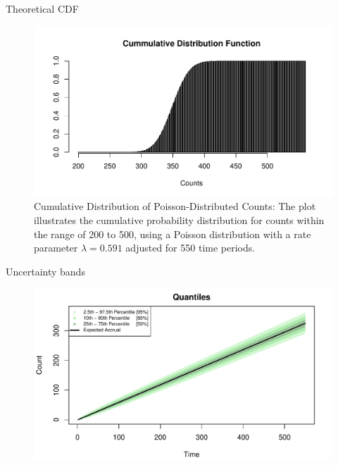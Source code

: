 \documentclass[english]{beamer}\usepackage[]{graphicx}\usepackage[]{xcolor}
\makeatletter
\def\maxwidth{ %
  \ifdim\Gin@nat@width>\linewidth
    \linewidth
  \else
    \Gin@nat@width
  \fi
}
\newenvironment{knitrout}{}{} %
\makeatother
\begin{document}
\begin{frame}{Theoretical CDF}

\begin{figure}
\begin{knitrout}
\color{fgcolor}
\includegraphics[width=\maxwidth]{figures/figunnamed-chunk-6-1} 
\end{knitrout}
  \caption{Cumulative Distribution of Poisson-Distributed Counts: The plot illustrates the cumulative probability distribution for counts within the range of 200 to 500, using a Poisson distribution with a rate parameter $\lambda = 0.591$ adjusted for 550 time periods.}
  \label{fig:2_4}
\end{figure}
\end{frame}

\begin{frame}{Uncertainty bands}


\begin{figure}
\begin{knitrout}
\color{fgcolor}
\includegraphics[width=\maxwidth]{figures/figunnamed-chunk-7-1} 
\end{knitrout}
\end{figure}

\end{frame}
\end{document}
